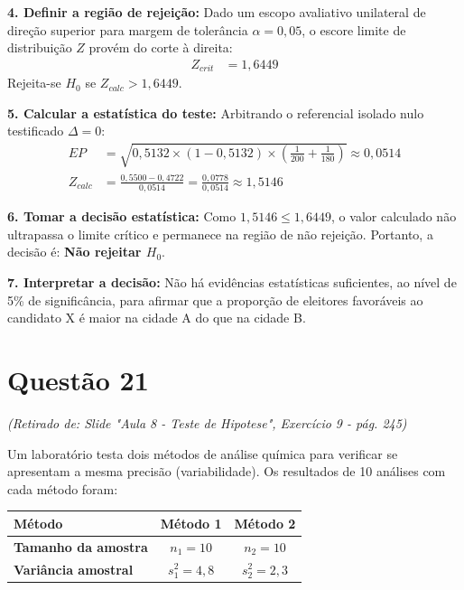 \documentclass[12pt, a4paper]{article}
\begin{document}
\noindent \textbf{4. Definir a região de rejeição:}
Dado um escopo avaliativo unilateral de direção superior para margem de tolerância $\alpha = 0{,}05$, o escore limite de distribuição $Z$ provém do corte à direita:
\begin{align*}
Z_{crit} &= \boxed{1{,}6449}
\end{align*}
Rejeita-se $H_0$ se $Z_{calc} > 1{,}6449$.

\noindent \textbf{5. Calcular a estatística do teste:}
Arbitrando o referencial isolado nulo testificado $\Delta = 0$:
\begin{align*}
EP &= \sqrt{0{,}5132 \times (1 - 0{,}5132) \times \left( \frac{1}{200} + \frac{1}{180} \right)} \approx \boxed{0{,}0514} \\
Z_{calc} &= \frac{0{,}5500 - 0{,}4722}{0{,}0514} = \frac{0{,}0778}{0{,}0514} \approx \boxed{1{,}5146}
\end{align*}

\noindent \textbf{6. Tomar a decisão estatística:}
Como $1{,}5146 \le 1{,}6449$, o valor calculado não ultrapassa o limite 
crítico e permanece na região de não rejeição. Portanto, a decisão é: 
\textbf{Não rejeitar $H_0$}.

\noindent \textbf{7. Interpretar a decisão:}
Não há evidências estatísticas suficientes, ao nível de 5\% de 
significância, para afirmar que a proporção de eleitores favoráveis 
ao candidato X é maior na cidade A do que na cidade B.

\section*{Questão 21}
\textit{(Retirado de: Slide "Aula 8 - Teste de Hipotese", Exercício 9 - pág. 245)}

Um laboratório testa dois métodos de análise química para verificar se apresentam a mesma precisão (variabilidade). Os resultados de 10 análises com cada método foram:

\begin{table}[h]
\centering
\begin{tabular}{lcc}
\toprule
\textbf{Método} & \textbf{Método 1} & \textbf{Método 2} \\ \midrule
\textbf{Tamanho da amostra} & $n_1 = 10$ & $n_2 = 10$ \\
\textbf{Variância amostral} & $s^2_1 = 4{,}8$ & $s^2_2 = 2{,}3$ \\ \bottomrule
\end{tabular}
\end{table}
\end{document}
